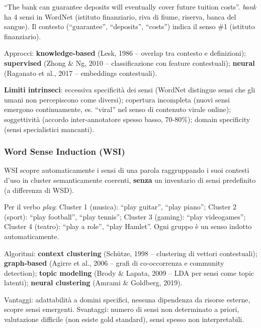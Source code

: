 \documentclass[12pt,a4paper]{article}
\begin{document}
\begin{examplebox}
``The bank can guarantee deposits will eventually cover future tuition costs''. \textit{bank} ha 4 sensi in WordNet (istituto finanziario, riva di fiume, riserva, banca del sangue). Il contesto (``guarantee'', ``deposits'', ``costs'') indica il senso \#1 (istituto finanziario).
\end{examplebox}

Approcci: \textbf{knowledge-based} (Lesk, 1986 -- overlap tra contesto e definizioni); \textbf{supervised} (Zhong \& Ng, 2010 -- classificazione con feature contestuali); \textbf{neural} (Raganato et al., 2017 -- embeddings contestuali).

\textbf{Limiti intrinseci}: eccessiva specificit\`a dei sensi (WordNet distingue sensi che gli umani non percepiscono come diversi); copertura incompleta (nuovi sensi emergono continuamente, es. ``viral'' nel senso di contenuto virale online); soggettivit\`a (accordo inter-annotatore spesso basso, 70-80\%); domain specificity (sensi specialistici mancanti).

\subsubsection{Word Sense Induction (WSI)}

\begin{defbox}
WSI scopre automaticamente i sensi di una parola raggruppando i suoi contesti d'uso in cluster semanticamente coerenti, \textbf{senza} un inventario di sensi predefinito (a differenza di WSD).
\end{defbox}

\begin{examplebox}
Per il verbo \textit{play}: Cluster 1 (musica): ``play guitar'', ``play piano''; Cluster 2 (sport): ``play football'', ``play tennis''; Cluster 3 (gaming): ``play videogames''; Cluster 4 (teatro): ``play a role'', ``play Hamlet''. Ogni gruppo \`e un senso indotto automaticamente.
\end{examplebox}

Algoritmi: \textbf{context clustering} (Sch\"utze, 1998 -- clustering di vettori contestuali); \textbf{graph-based} (Agirre et al., 2006 -- grafi di co-occorrenza e community detection); \textbf{topic modeling} (Brody \& Lapata, 2009 -- LDA per sensi come topic latenti); \textbf{neural clustering} (Amrami \& Goldberg, 2019).

Vantaggi: adattabilit\`a a domini specifici, nessuna dipendenza da risorse esterne, scopre sensi emergenti. Svantaggi: numero di sensi non determinato a priori, valutazione difficile (non esiste gold standard), sensi spesso non interpretabili.
\end{document}
